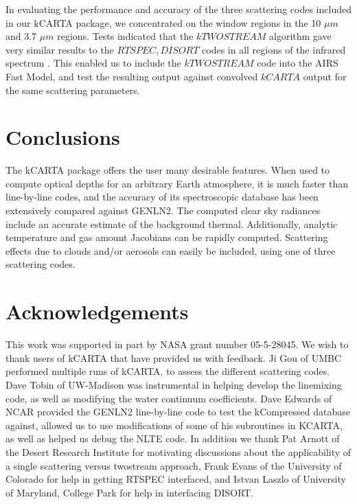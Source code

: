 \documentclass[11pt]{article}
\newcommand{\kc}{\textsf{kCARTA}\xspace}
\begin{document}
In evaluating the performance and accuracy of the three scattering codes 
included in our \textsf{kCARTA} package, we concentrated on the window regions
in the 10 $\mu m$ and 3.7 $\mu m$ regions. Tests indicated that the 
$kTWOSTREAM$ algorithm gave very similar results to the $RTSPEC, DISORT$ codes
in all regions of the infrared spectrum \cite{mac:02*1}. This enabled us to 
include the $kTWOSTREAM$ code into the AIRS Fast Model, and test the resulting
output against convolved $kCARTA$ output for the same scattering parameters.


\section{Conclusions}
The \textsf{kCARTA} package offers the user many desirable features. When used
to compute optical depths for an arbitrary Earth atmosphere, it is much faster
than line-by-line codes, and the accuracy of its spectroscopic database has 
been extensively compared  against \textsf{GENLN2}. The computed clear sky 
radiances include an accurate estimate of the background thermal. 
Additionally, analytic temperature and gas amount Jacobians can be rapidly 
computed. Scattering effects due to clouds and/or aerosols can easily be 
included, using one of three scattering codes. 

\section{Acknowledgements}
This work was supported in part by NASA grant number 05-5-28045. We wish to 
thank users of kCARTA that have provided us with feedback. Ji Gou of UMBC 
performed multiple runs of \kc, to assess the different scattering codes. 
Dave Tobin of UW-Madison was instrumental in helping develop the \cd 
linemixing code, as well as modifying the water continuum coefficients. Dave 
Edwards of NCAR provided the {\sf GENLN2} line-by-line code to test the 
{\sf kCompressed} database against, allowed us to use modifications of some of 
his subroutines in {\sf KCARTA}, as well as helped us debug the NLTE code. 
In addition we thank Pat Arnott of the 
Desert Research Institute for motivating discussions about the applicability 
of a single scattering versus twostream approach, Frank Evans of the 
University of Colorado for help in getting RTSPEC interfaced, and Istvan 
Laszlo of University of Maryland, College Park for help in interfacing 
DISORT.



\end{document}
